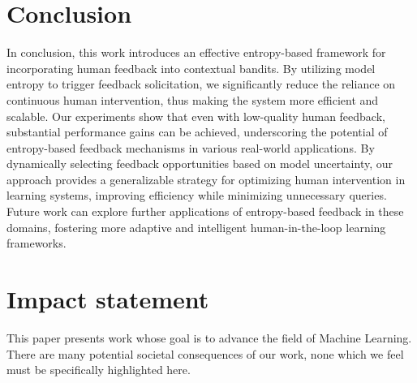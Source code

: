 \section{Conclusion}

In conclusion, this work introduces an effective entropy-based framework for incorporating human feedback into contextual bandits. By utilizing model entropy to trigger feedback solicitation, we significantly reduce the reliance on continuous human intervention, thus making the system more efficient and scalable. Our experiments show that even with low-quality human feedback, substantial performance gains can be achieved, underscoring the potential of entropy-based feedback mechanisms in various real-world applications. By dynamically selecting feedback opportunities based on model uncertainty, our approach provides a generalizable strategy for optimizing human intervention in learning systems, improving efficiency while minimizing unnecessary queries. Future work can explore further applications of entropy-based feedback in these domains, fostering more adaptive and intelligent human-in-the-loop learning frameworks.
 

\section{Impact statement}
This paper presents work whose goal is to advance the field of Machine Learning. There are many potential societal consequences of our work, none which we feel must be specifically highlighted here.
